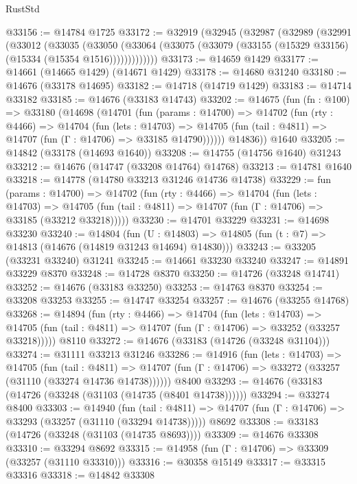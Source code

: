 \begin{lexlean}{RustStd}
\begin{coremodule}
@33156 := @14784 @1725
@33172 := @32919
    (@32945
      (@32987
        (@32989
          (@32991
            (@33012
              (@33035
                (@33050
                  (@33064 (@33075 (@33079 (@33155 (@15329 @33156) (@15334 (@15354 @1516)))))))))))))
@33173 := @14659 @1429
@33177 := @14661 (@14665 @1429) (@14671 @1429)
@33178 := @14680 @31240
@33180 := @14676 (@33178 @14695)
@33182 := @14718 (@14719 @1429)
@33183 := @14714 @33182
@33185 := @14676 (@33183 @14743)
@33202 := @14675
    (fun (fn : @100) =>
    @33180
      (@14698
        (@14701
          (fun (params : @14700) =>
          @14702
            (fun (rty : @4466) =>
            @14704
              (fun (lets : @14703) =>
              @14705 (fun (tail : @4811) => @14707 (fun (Γ : @14706) => @33185 @14790))))))
        @14836))
    @1640
@33205 := @14842 (@33178 (@14693 @1640))
@33208 := @14755 (@14756 @1640) @31243
@33212 := @14676 (@14747 (@33208 @14764) @14768)
@33213 := @14781 @1640
@33218 := @14778 (@14780 @33213 @31246 @14736 @14738)
@33229 := fun (params : @14700) =>
  @14702
    (fun (rty : @4466) =>
    @14704
      (fun (lets : @14703) =>
      @14705 (fun (tail : @4811) => @14707 (fun (Γ : @14706) => @33185 (@33212 @33218)))))
@33230 := @14701 @33229
@33231 := @14698 @33230
@33240 := @14804
    (fun (U : @14803) => @14805 (fun (t : @7) => @14813 (@14676 (@14819 @31243 @14694) @14830)))
@33243 := @33205 (@33231 @33240) @31241
@33245 := @14661 @33230 @33240
@33247 := @14891 @33229 @8370
@33248 := @14728 @8370
@33250 := @14726 (@33248 @14741)
@33252 := @14676 (@33183 @33250)
@33253 := @14763 @8370
@33254 := @33208 @33253
@33255 := @14747 @33254
@33257 := @14676 (@33255 @14768)
@33268 := @14894
    (fun (rty : @4466) =>
    @14704
      (fun (lets : @14703) =>
      @14705 (fun (tail : @4811) => @14707 (fun (Γ : @14706) => @33252 (@33257 @33218)))))
    @8110
@33272 := @14676 (@33183 (@14726 (@33248 @31104)))
@33274 := @31111 @33213 @31246
@33286 := @14916
    (fun (lets : @14703) =>
    @14705
      (fun (tail : @4811) =>
      @14707 (fun (Γ : @14706) => @33272 (@33257 (@31110 (@33274 @14736 @14738))))))
    @8400
@33293 := @14676 (@33183 (@14726 (@33248 (@31103 (@14735 (@8401 @14738))))))
@33294 := @33274 @8400
@33303 := @14940
    (fun (tail : @4811) => @14707 (fun (Γ : @14706) => @33293 (@33257 (@31110 (@33294 @14738)))))
    @8692
@33308 := @33183 (@14726 (@33248 (@31103 (@14735 @8693))))
@33309 := @14676 @33308
@33310 := @33294 @8692
@33315 := @14958 (fun (Γ : @14706) => @33309 (@33257 (@31110 @33310)))
@33316 := @30358 @15149
@33317 := @33315 @33316
@33318 := @14842 @33308

\end{coremodule}
\end{lexlean}
